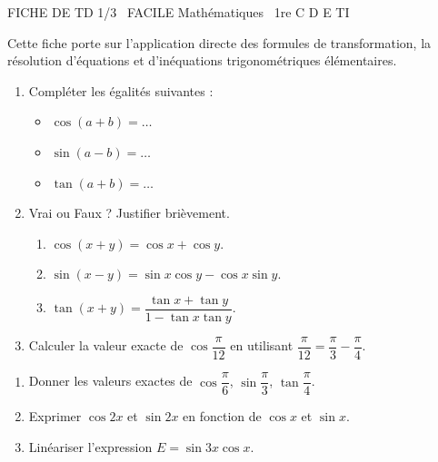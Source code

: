 \documentclass[11pt]{article}
\begin{document}
\begin{tcolorbox}[enhanced,colback=popink,colframe=popink,arc=10pt,boxrule=0pt,left=12pt,right=12pt,top=9pt,bottom=9pt]
{\color{white}\popxbold\small FICHE DE TD 1/3 \textbullet\ FACILE \hfill Mathématiques \textbullet\ 1re C D E TI\par}
\end{tcolorbox}
\vspace{4pt}
Cette fiche porte sur l'application directe des formules de transformation, la résolution d'équations et d'inéquations trigonométriques élémentaires.

\begin{exercice}
\begin{enumerate}
    \item Compléter les égalités suivantes :
    \begin{itemize}
        \item $\cos(a+b) = \dots$
        \item $\sin(a-b) = \dots$
        \item $\tan(a+b) = \dots$
    \end{itemize}
    \item Vrai ou Faux ? Justifier brièvement.
    \begin{enumerate}
        \item $\cos(x+y) = \cos x + \cos y$.
        \item $\sin(x-y) = \sin x \cos y - \cos x \sin y$.
        \item $\tan(x+y) = \dfrac{\tan x + \tan y}{1 - \tan x \tan y}$.
    \end{enumerate}
    \item Calculer la valeur exacte de $\cos\dfrac{\pi}{12}$ en utilisant $\dfrac{\pi}{12} = \dfrac{\pi}{3} - \dfrac{\pi}{4}$.
\end{enumerate}
\end{exercice}

\begin{exercice}
\begin{enumerate}
    \item Donner les valeurs exactes de $\cos\dfrac{\pi}{6}$, $\sin\dfrac{\pi}{3}$, $\tan\dfrac{\pi}{4}$.
    \item Exprimer $\cos 2x$ et $\sin 2x$ en fonction de $\cos x$ et $\sin x$.
    \item Linéariser l'expression $E = \sin 3x \cos x$.
\end{enumerate}
\end{exercice}
\end{document}
